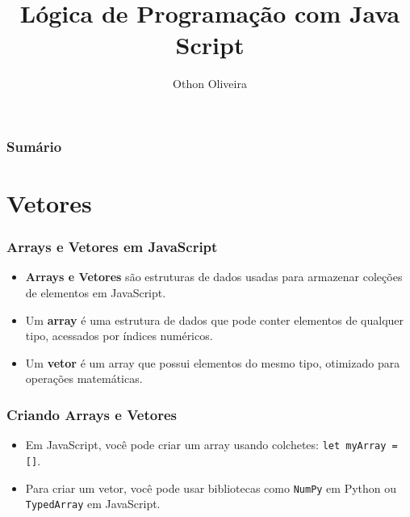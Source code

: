\documentclass[13pt, xcolor={dvipsnames,svgnames}, portuguese]{beamer}
\author{Othon Oliveira}
\title{Lógica de Programação com Java Script}
\institute{SENAC - PROA}
\date{}
\begin{document}
\begin{frame}
\titlepage
\end{frame}

\newcommand{\capa}{
    \begin{tikzpicture}[remember picture,overlay]
        \node at (current page.south west)
            {\begin{tikzpicture}[remember picture, overlay]
                \fill[shading=radial,top color=orange,bottom color=orange,middle color=yellow] (0,0) rectangle (\paperwidth,\paperheight);
            \end{tikzpicture}
          };
    \end{tikzpicture}
}

\begin{frame}\frametitle{Sumário}
\tableofcontents
\end{frame}


\section{Vetores}
\begin{frame}
\frametitle{Arrays e Vetores em JavaScript}
\begin{itemize}
  \item<1-> \textbf{Arrays e Vetores} são estruturas de dados usadas para armazenar coleções de elementos em JavaScript.
  \item<2-> Um \textbf{array} é uma estrutura de dados que pode conter elementos de qualquer tipo, acessados por índices numéricos.
  \item<3-> Um \textbf{vetor} é um array que possui elementos do mesmo tipo, otimizado para operações matemáticas.
\end{itemize}
\end{frame}

\begin{frame}
\frametitle{Criando Arrays e Vetores}
\begin{itemize}
  \item<1-> Em JavaScript, você pode criar um array usando colchetes: \texttt{let myArray = []}.
  \item<2-> Para criar um vetor, você pode usar bibliotecas como \texttt{NumPy} em Python ou \texttt{TypedArray} em JavaScript.
\end{itemize}
\end{frame}
\end{document}
